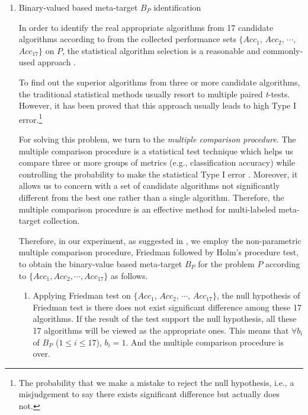 \documentclass[prodmode,acmtkdd]{acmsmall}
\begin{document}
\begin{enumerate}
\begin{enumerate}
        \item{Binary-valued based meta-target $B_{P}$ identification}

        In order to identify the real appropriate algorithms from
        17 candidate algorithms according to from the
        collected performance sets $\{Acc_1$, $Acc_2$, $\cdots$, $Acc_{17}\}$ on $P$,
        the statistical algorithm selection is a reasonable and commonly-used approach
        \cite{pizarro2002multiple}.

        \quad To find out the superior algorithms from three or
        more candidate algorithms, the traditional statistical methods
        usually resort to multiple paired \emph{t}-tests. However, it has
        been proved that this approach usually leads to high Type I
        error.\footnote{The probability that we make a mistake to reject the
        null hypothesis, i.e., a misjudgement to say there exists
        significant difference but actually does not.}

        \quad For solving this problem, we turn to the \emph{multiple comparison
        procedure}. The multiple comparison procedure is a statistical test
        technique which helps us compare three or more groups of metrics
        (e.g., classification accuracy) while controlling the probability to make the statistical Type I
        error \cite{pizarro2002multiple}. Moreover, it allows us to concern with a
        set of candidate algorithms not significantly different from the best one
        rather than a single algorithm. Therefore, the multiple comparison procedure is
        an effective method for multi-labeled meta-target collection.

        \quad Therefore, in our experiment, as suggested in \cite{demvar2006statistical}, we employ
        the non-parametric multiple comparison procedure, Friedman followed by Holm's
        procedure test, to obtain the binary-value based meta-target $B_{P}$ for the problem
        $P$ according to $\{Acc_1, Acc_2, \cdots, Acc_{17}\}$ as follows.
        \begin{enumerate}
            \item Applying Friedman test on $\{Acc_1$, $Acc_2$, $\cdots$, $Acc_{17}\}$, the
            null hypothesis of Friedman test is there does not exist
            significant difference among these 17 algorithms. If the result
             of the test support the null hypothesis, all these 17 algorithms
            will be viewed as the appropriate ones. This means that $\forall
            b_i$ of $B_{P}$ ($1\leq i\leq 17$), $b_i = 1$. And the multiple
            comparison procedure is over.


\end{enumerate}
\end{enumerate}
\end{enumerate}
\end{document}
